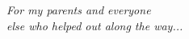 \newpage
\vspace*{4cm}
\large
\begin{flushright}
\itshape{For my parents and everyone\\else who helped out along the way...}
\end{flushright}
